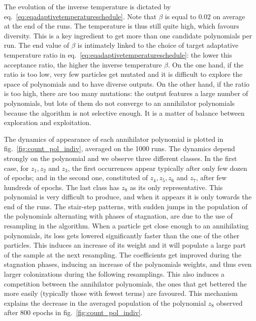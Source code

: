 \documentclass[11pt,a4paper]{article}
\begin{document}
	The evolution of the inverse temperature is dictated by eq.~\eqref{eq:eqadaptivetemperatureschedule}. Note that $\beta$ is equal to $0.02$ on average at the end of the runs. The temperature is thus still quite high, which favours diversity. This is a key ingredient to get more than one candidate polynomials per run. The end value of $\beta$ is intimately linked to the choice of target adaptative temperature ratio in eq.~\eqref{eq:eqadaptivetemperatureschedule}: the lower this acceptance ratio, the higher the inverse temperature $\beta$. On the one hand, if the ratio is too low, very few particles get mutated and it is difficult to explore the space of polynomials and to have diverse outputs. On the other hand, if the ratio is too high, there are too many mutations: the output features a large number of polynomials, but lots of them do not converge to an annihilator polynomials because the algorithm is not selective enough. It is a matter of balance between exploration and exploitation.

	The dynamics of appearance of each annihilator polynomial is plotted in fig.~\ref{fig:count_pol_indiv}, averaged on the 1000 runs. The dynamics depend strongly on the polynomial and we observe three different classes. In the first case, for $z_{1}, z_{2}$ and $z_{3}$, the first occurrences appear typically after only few dozen of epochs; and in the second one, constituted of $z_{4}, z_{5}, z_{6}$ and $z_{7}$, after few hundreds of epochs. The last class has $z_{8}$ as its only representative. This polynomial is very difficult to produce, and when it appears it is only towards the end of the runs. The stair-step patterns, with sudden jumps in the population of the polynomials alternating with phases of stagnation, are due to the use of resampling in the algorithm. When a particle get close enough to an annihilating polynomials, its loss gets lowered significantly faster than the one of the other particles. This induces an increase of its weight and it will populate a large part of the sample at the next resampling. The coefficients get improved during the stagnation phases, inducing an increase of the polynomials weights, and thus even larger colonizations during the following resamplings. This also induces a competition between the annihilator polynomials, the ones that get bettered the more easily (typically those with fewest terms) are favoured. This mechanism explains the decrease in the averaged population of the polynomial $z_{8}$ observed after 800 epochs in fig.~\ref{fig:count_pol_indiv}.
\end{document}
